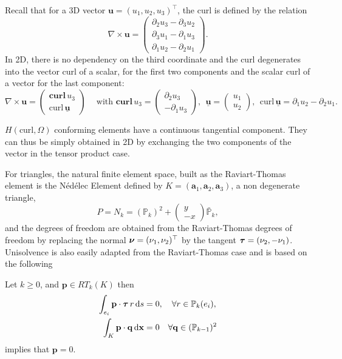 Recall that for a 3D vector $\mathbf{u}=(u_1,u_2,u_3)^\top$, the curl is defined by the relation
$$ \nabla\times \mathbf{u} = \begin{pmatrix}
\partial_2 u_3 - \partial_3 u_2 \\ \partial_3 u_1 - \partial_1 u_3 \\ \partial_1 u_2 - \partial_2 u_1 
\end{pmatrix}.$$
In 2D, there is no dependency on the third coordinate and the curl degenerates into the vector curl of a scalar, for the first two components and the scalar curl of a vector for the last component:
$$ \nabla\times \mathbf{u} =
  \begin{pmatrix}
  \mathbf{curl}\, u_3 \\  \mathrm{curl}\, \underline{\mathbf{u}}
  \end{pmatrix}~~~~
  \mbox{ with }  
  \mathbf{curl}\, u_3 =  \begin{pmatrix}
\partial_2 u_3  \\  - \partial_1 u_3
\end{pmatrix}, ~~
\underline{\mathbf{u}} =  \begin{pmatrix}
u_1  \\  u_2
\end{pmatrix}, ~~
\mathrm{curl}\, \underline{\mathbf{u}} = \partial_1 u_2 - \partial_2 u_1.
$$

$ H(\textrm{curl}, \Omega)$ conforming elements have a continuous tangential component. They can thus be simply obtained in 2D by exchanging the two components of the vector in the tensor product case.

For triangles, the natural finite element space, built as the Raviart-Thomas element is the N\'ed\'elec Element defined by $K=( \mathbf{a}_1, \mathbf{a}_2, \mathbf{a}_3)$, a non degenerate triangle,
$$P=N_k = (\mathbb{P}_k)^2 + \begin{pmatrix} y\\ -x \end{pmatrix} \bar{ \mathbb{P}}_k, $$
and the degrees of freedom are obtained from the Raviart-Thomas degrees of freedom by replacing the normal  $\boldsymbol{\nu}=(\nu_1,\nu_2)^\top$ by the tangent $ \boldsymbol{\tau}=(\nu_2,-\nu_1)$. 
Unisolvence is also easily adapted from the Raviart-Thomas case and is based on the following 
\begin{lemma} Let $k\geq 0$, and $ \mathbf{p}\in RT_k(K)$ then
\begin{align}
\int_{e_i} \mathbf{p}\cdot \boldsymbol{\tau} \,r \,{\rm d} s &=0, \quad \forall r\in \mathbb{P}_k(e_i), \label{eq:Ne}\\
\int_K \mathbf{p}  \cdot \mathbf{q} \,{\rm d} \mathbf{x} &=0 \quad\forall \mathbf{q} \in (\mathbb{P}_{k-1})^2
\label{eq:Nf}
\end{align}
implies that $ \mathbf{p}=0$.
\end{lemma}


